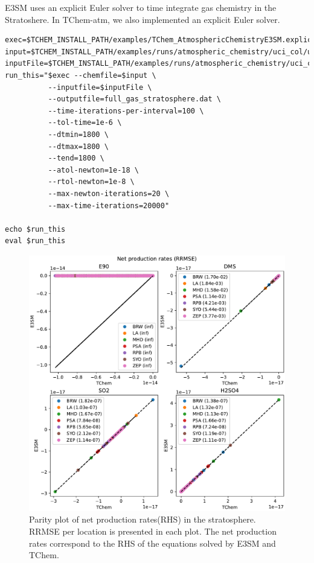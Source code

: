 \documentclass[report, 12pt]{SANDreport}
\begin{document}
E3SM uses an explicit Euler solver to time integrate gas chemistry in the Stratoshere. In TChem-atm, we also implemented an explicit Euler solver.


\begin{Verbatim}
exec=$TCHEM_INSTALL_PATH/examples/TChem_AtmosphericChemistryE3SM.explicit_euler.x
input=$TCHEM_INSTALL_PATH/examples/runs/atmospheric_chemistry/uci_col/uci_explicit_mech.yaml
inputFile=$TCHEM_INSTALL_PATH/examples/runs/atmospheric_chemistry/uci_col/input_conditions_explicit_part_multi_col.yaml
run_this="$exec --chemfile=$input \
          --inputfile=$inputFile \
          --outputfile=full_gas_stratosphere.dat \
          --time-iterations-per-interval=100 \
          --tol-time=1e-6 \
          --dtmin=1800 \
          --dtmax=1800 \
          --tend=1800 \
          --atol-newton=1e-18 \
          --rtol-newton=1e-8 \
          --max-newton-iterations=20 \
          --max-time-iterations=20000"

echo $run_this
eval $run_this
\end{Verbatim}

\begin{figure}[htp]
  \centering
  \includegraphics[width=1\textwidth]{figures/net_production_rates_stratosphere.pdf}
 \caption{Parity plot of net production rates(RHS) in the stratosphere. RRMSE per location is presented in each plot. The net production rates correspond to the RHS of the equations solved by E3SM and TChem.
}
\label{fig:net_production_rates_stratosphere}
\end{figure}
\end{document}
